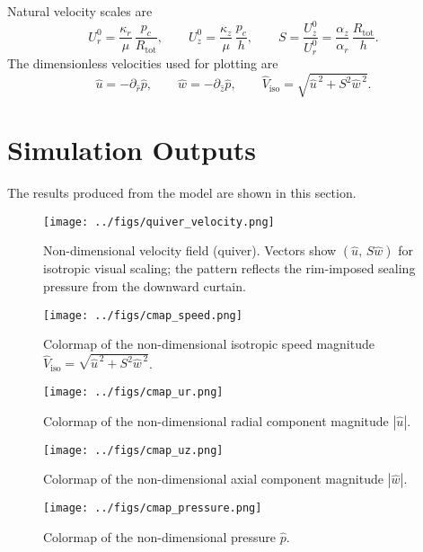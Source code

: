 \documentclass[11pt,a4paper]{article}
\begin{document}
Natural velocity scales are
\begin{equation}
  U_r^0=\frac{\kappa_r}{\mu}\,\frac{p_c}{R_{\mathrm{tot}}},\qquad
  U_z^0=\frac{\kappa_z}{\mu}\,\frac{p_c}{h},\qquad
  S=\frac{U_z^0}{U_r^0}
  =\frac{\alpha_z}{\alpha_r}\,\frac{R_{\mathrm{tot}}}{h}.
\end{equation}
The dimensionless velocities used for plotting are
\begin{equation}
  \hat u=-\partial_{\hat r}\hat p,\qquad
  \hat w=-\partial_{\hat z}\hat p,\qquad
  \hat V_{\mathrm{iso}}=\sqrt{\hat u^{\,2}+S^{2}\hat w^{\,2}}.
\end{equation}

\section{Simulation Outputs}
\label{sec:simulation-outputs}

The results produced from the model are shown in this section.

\begin{figure}[H]
  \centering
  \texttt{[image: ../figs/quiver\_velocity.png]}
  \caption{Non-dimensional velocity field (quiver).
Vectors show $(\hat u,\,S\hat w)$ for isotropic visual scaling; the pattern reflects the rim-imposed sealing pressure from the downward curtain.}
  \label{fig:quiver}
\end{figure}
\begin{figure}[H]
  \centering
  \texttt{[image: ../figs/cmap\_speed.png]}
  \caption{Colormap of the non-dimensional isotropic speed magnitude $\hat V_{\mathrm{iso}}=\sqrt{\hat u^{\,2}+S^{2}\hat w^{\,2}}$.}
  \label{fig:cmap_speed}
\end{figure}
\begin{figure}[H]
  \centering
  \texttt{[image: ../figs/cmap\_ur.png]}
  \caption{Colormap of the non-dimensional radial component magnitude $|\hat u|$.}
  \label{fig:cmap_ur}
\end{figure}
\begin{figure}[H]
  \centering
  \texttt{[image: ../figs/cmap\_uz.png]}
  \caption{Colormap of the non-dimensional axial component magnitude $|\hat w|$.}
  \label{fig:cmap_uz}
\end{figure}
\begin{figure}[H]
  \centering
  \texttt{[image: ../figs/cmap\_pressure.png]}
  \caption{Colormap of the non-dimensional pressure $\hat p$.}
  \label{fig:cmap_p}
\end{figure}
\end{document}
